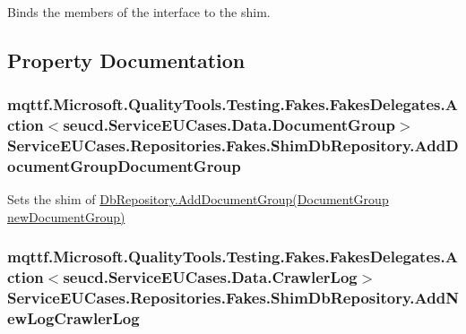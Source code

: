 Binds the members of the interface to the shim.



\subsection{Property Documentation}
\hypertarget{class_service_e_u_cases_1_1_repositories_1_1_fakes_1_1_shim_db_repository_a489137bf40a57360d5d33265a2655246}{
\subsubsection[{Add\-Document\-Group\-Document\-Group}]{\setlength{\rightskip}{0pt plus 5cm}mqttf.\-Microsoft.\-Quality\-Tools.\-Testing.\-Fakes.\-Fakes\-Delegates.\-Action$<$seucd.\-Service\-E\-U\-Cases.\-Data.\-Document\-Group$>$ Service\-E\-U\-Cases.\-Repositories.\-Fakes.\-Shim\-Db\-Repository.\-Add\-Document\-Group\-Document\-Group\hspace{0.3cm}{\ttfamily [set]}}}\label{class_service_e_u_cases_1_1_repositories_1_1_fakes_1_1_shim_db_repository_a489137bf40a57360d5d33265a2655246}


Sets the shim of \hyperlink{class_service_e_u_cases_1_1_repositories_1_1_db_repository_ae4b034e9103223b0b8bb78383032d466}{Db\-Repository.\-Add\-Document\-Group(\-Document\-Group new\-Document\-Group)}

\hypertarget{class_service_e_u_cases_1_1_repositories_1_1_fakes_1_1_shim_db_repository_a901999a4658a62b07376ee98f3b40942}{
\subsubsection[{Add\-New\-Log\-Crawler\-Log}]{\setlength{\rightskip}{0pt plus 5cm}mqttf.\-Microsoft.\-Quality\-Tools.\-Testing.\-Fakes.\-Fakes\-Delegates.\-Action$<$seucd.\-Service\-E\-U\-Cases.\-Data.\-Crawler\-Log$>$ Service\-E\-U\-Cases.\-Repositories.\-Fakes.\-Shim\-Db\-Repository.\-Add\-New\-Log\-Crawler\-Log\hspace{0.3cm}{\ttfamily [set]}}}\label{class_service_e_u_cases_1_1_repositories_1_1_fakes_1_1_shim_db_repository_a901999a4658a62b07376ee98f3b40942}


